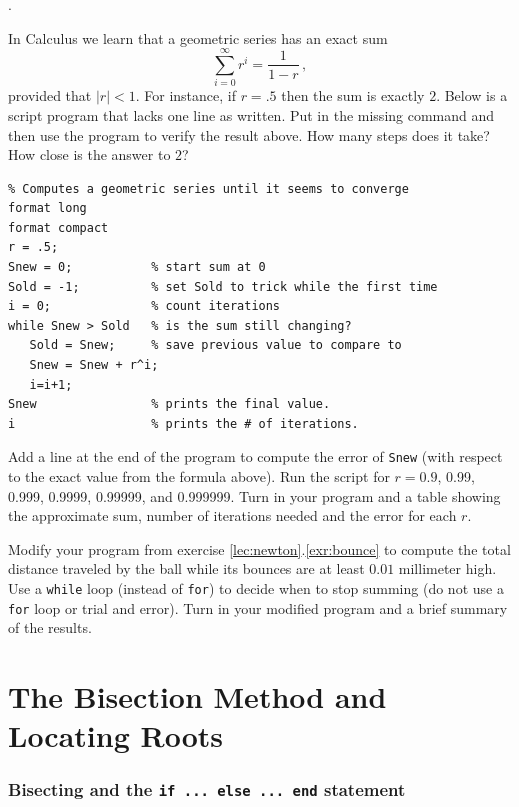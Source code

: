 \nobreak
\begin{list}
{.}{}

\item In Calculus we learn that a geometric series has an exact sum
$$
   \sum_{i=0}^\infty r^i = \frac{1}{1-r}
   \,,
$$
provided that $|r|<1$. For instance, if $r = .5$ then the sum is
exactly $2$.  Below is a script program that lacks one line as
written.  Put in the missing command and then use the program to
verify the result above. How many steps does it take? How close is the
answer to $2$?
\begin{lstlisting}
% Computes a geometric series until it seems to converge
format long
format compact
r = .5;
Snew = 0;           % start sum at 0
Sold = -1;          % set Sold to trick while the first time
i = 0;              % count iterations
while Snew > Sold   % is the sum still changing?
   Sold = Snew;     % save previous value to compare to
   Snew = Snew + r^i;
   i=i+1;
Snew                % prints the final value.
i                   % prints the # of iterations.
\end{lstlisting}
Add a line at the end of the program to compute the error of
\verb&Snew& (with respect to the exact value from the formula above). 
Run the script for $r=0.9$, 0.99, 0.999, 0.9999, 0.99999, and 0.999999. 
Turn in your program and a table showing the approximate sum, number of iterations needed and the error for each $r$.


\item Modify your program from exercise
  \ref{lec:newton}.\ref{exr:bounce} to compute the total distance
  traveled by the ball while its bounces are at least  $0.01$ millimeter
  high. Use a \verb&while& loop (instead of  \verb&for&)  to decide when to stop summing (do not
  use a \verb&for& loop or trial and error). Turn in your modified program and
  a brief summary of the results.

\end{list}




\chapter{The Bisection Method and Locating Roots}
\label{lec:bisection}


\subsection*{Bisecting and the \texttt{if ... else ... end} statement}

